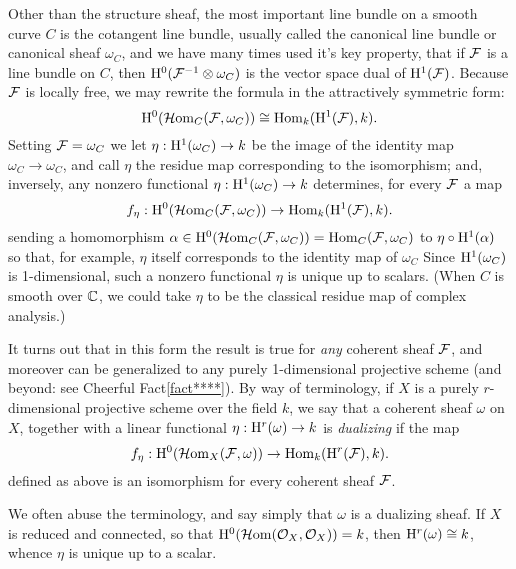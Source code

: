 Other than  the structure sheaf, the most important line bundle on a smooth curve $C$  is the cotangent line bundle, usually called the canonical line bundle or canonical sheaf $\omega_{C}$, and  we have many times used it's key property, that if  $\cF$  is a line bundle on $C$, then $\HH^{0}(\sF^{-1}\otimes \omega_{C})$ is the vector space dual of $\HH^{1}(\cF)$. Because $\sF$ is locally free, we may rewrite the formula in the attractively symmetric form:
$$
\HH^{0}(\sHom_{C}(\sF, \omega_{C})) 
\cong 
\Hom_{k}(\HH^{1}(\cF), k).
$$
Setting $\sF = \omega_{C}$ we let $\eta: \HH^{1}(\omega_{C})\to k$ be the image of 
the identity map $\omega_{C} \to \omega_{C}$, and call $\eta$ the residue map corresponding to the isomorphism; and, inversely, any nonzero functional 
$\eta: \HH^{1}(\omega_{C})\to k$
determines, for every $\sF$ a map
$$
f_{\eta}: \HH^{0}(\sHom_{C}(\sF, \omega_{C}))
\to
\Hom_{k}(\HH^{1}(\cF), k).
$$
sending a homomorphism
$\alpha \in \HH^{0}(\sHom_{C}(\sF, \omega_{C})) = \Hom_{C}(\sF, \omega_{C})$
to $\eta \circ \HH^{1}(\alpha)$ so that, for example, $\eta$ itself corresponds to the 
identity map of $\omega_{C}$  Since $\HH^{1}(\omega_{C})$ is 1-dimensional, such a nonzero functional $\eta$ is unique up to scalars. (When $C$ is smooth over $\CC$, we could take $\eta$ to be the classical residue map of complex analysis.)

It turns out that in this form the result is true for \emph{any} coherent sheaf $\cF$, and moreover can be generalized to any purely 1-dimensional projective scheme (and beyond: see Cheerful Fact\ref{fact****}). By way of terminology, if $X$ is a purely $r$-dimensional projective scheme over the field $k$, we say that a coherent sheaf $\omega$ on $X$, together with a linear
functional $\eta:\HH^{r}(\omega) \to k$ is \emph{dualizing} if the map
$$
f_{\eta}: \HH^{0}(\sHom_{X}(\sF, \omega))
\to
\Hom_{k}(\HH^{r}(\cF), k).
$$
defined as above is an isomorphism for every coherent sheaf $\sF$.

We often abuse the terminology, and say simply that $\omega$ is a dualizing sheaf. If $X$ is reduced and connected, so that $\HH^{0} (\sHom(\sO_{X} , \sO_{X})) = k$, then
$\HH^{r}(\omega) \cong k$, whence $\eta$ is unique up to a scalar. 


